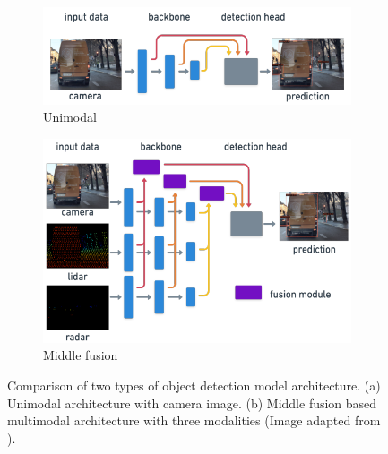\documentclass[report.tex]{subfiles}
\begin{document}
    
    \begin{figure}[h]
        \centering
        \begin{subfigure}[b]{0.45\textwidth}
            \centering
            \includegraphics[width=\textwidth]{images/methods/mtdetr/unimodal.png}
            \caption{Unimodal}
            \label{fig:mt_detr_unimodal_architecture}
        \end{subfigure}
        \hfill %
        \begin{subfigure}[b]{0.45\textwidth}
            \centering
            \includegraphics[width=\textwidth]{images/methods/mtdetr/middle_fusion.png}
            \caption{Middle fusion}
            \label{fig:mt_detr_middle_fusion}
        \end{subfigure}
        \caption{Comparison of two types of object detection model architecture. (a) Unimodal architecture with camera image. (b) Middle fusion based multimodal architecture with three modalities (Image adapted from \cite{chu2023mt}).} %
        \label{fig:mt_detr_unimodal_and_middle_fusion}
    \end{figure}
\end{document}
